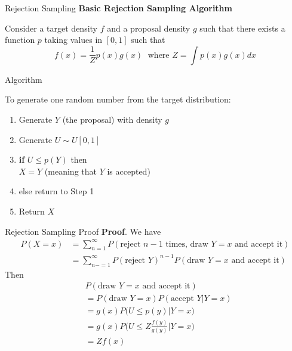 \documentclass[8pt]{beamer}
\begin{document}
\begin{frame}{Rejection Sampling}
\textbf{Basic Rejection Sampling Algorithm}

Consider a target density $f$ and a proposal density $g$ such that there exists a function $p$ taking values in $[0,1]$ such that 
\begin{equation*}
f(x)=\frac{1}{Z}p(x)g(x)  \; \text{ where } Z=\int p(x) g(x) dx
\end{equation*}

\alert{Algorithm}

To generate one random number from the target distribution:

\begin{enumerate}
	\item Generate $Y$ (the proposal) with density $g$ 
	\item Generate $U \sim U[0,1]$
	\item {\bf if} $U \leq p(Y)$ then \\
       $X=Y$ (meaning that $Y$ is accepted)\\  
	\item else return to Step 1
	\item Return $X$
\end{enumerate}
\end{frame}

\begin{frame}{Rejection Sampling Proof}
\textbf{Proof}.
We have
\begin{align*}
P(X = x) &= \sum_{n=1}^{\infty} P(\text{reject $n-1$ times, draw $Y = x$ and accept it})\\
&= \sum_{n-=1}^{\infty}P(\text{reject $Y$})^{n-1}P(\text{draw $Y = x$ and accept it})
\end{align*}
Then
\begin{align*}
& P(\text{draw $Y = x$ and accept it})\\
&= P(\text{draw $Y = x$})P(\text{accept $Y|Y=x$})\\
&= g(x)P\biggl(U \leq p(y)| Y = x \biggl) \\
&= g(x)P\biggl(U \leq Z\frac{f(y)}{g(y)} \biggl| Y = x \biggl)\\
&= Zf(x)
\end{align*}
\end{frame}
\end{document}
